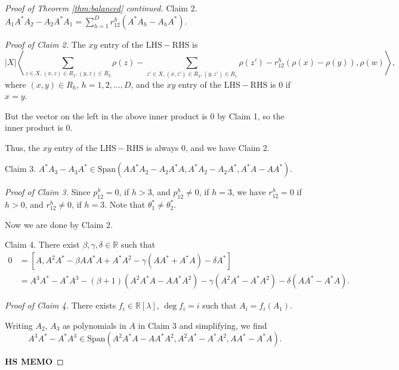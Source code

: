\documentclass[
]{book}
\theoremstyle{definition}
\theoremstyle{definition}
\theoremstyle{definition}
\theoremstyle{definition}
\theoremstyle{remark}
\begin{document}
\begin{proof}[Proof of Theorem \ref{thm:balanced} continued]
Claim 2.
\({\displaystyle A_1A^*A_2 - A_2A^*A_1 = \sum_{h=1}^D r^h_{12}(A^*A_h - A_hA^*).}\)

\emph{Proof of Claim 2.}
The \(xy\) entry of the \(\mathrm{LHS} - \mathrm{RHS}\) is
\[|X|\left\langle \sum_{z\in X, (x,z)\in R_1, (y,z)\in R_2}\rho(z) - \sum_{z'\in X, (x,z')\in R_2, (y,z')\in R_1}\rho(z') - r^h_{12}(\rho(x)-\rho(y)),\rho(w)\right\rangle,\]
where \((x,y)\in R_h\), \(h = 1, 2, \ldots, D\), and the \(xy\) entry of the \(\mathrm{LHS} - \mathrm{RHS}\) is \(0\) if \(x = y\).

But the vector on the left in the above inner product is \(0\) by Claim 1, so the inner product is \(0\).

Thus, the \(xy\) entry of the \(\mathrm{LHS} - \mathrm{RHS}\) is always \(0\), and we have Claim 2.

Claim 3. \(A^*A_3 - A_3A^* \in \mathrm{Span}(AA^*A_2 - A_2A^*A, A^*A_2 - A_2A^*, A^*A-AA^*).\)

\emph{Proof of Claim 3.}
Since \(p^h_{12} = 0\), if \(h>3\), and \(p^h_{12} \neq 0\), if \(h=3\), we have \(r^h_{12} = 0\) if \(h > 0\), and \(r^h_{12} \neq 0\), if \(h = 3\). Note that \(\theta^*_1\neq \theta^*_2\).

Now we are done by Claim 2.

Claim 4. There exist \(\beta, \gamma, \delta\in \mathbb{R}\) such that
\begin{align}
0 & = [A, A^2A^*-\beta AA^*A + A^*A^2 - \gamma(AA^*+A^*A) - \delta A^*]\\
& = A^3A^* - A^*A^3 - (\beta+1)(A^2A^*A-AA^*A^2)-\gamma(A^2A^*-A^*A^2)-\delta(AA^*-A^*A).
\end{align}

\emph{Proof of Claim 4.}
There exists \(f_i\in \mathbb{R}[\lambda]\), \(\deg f_i = i\) such that \(A_i = f_i(A_1)\).

Writing \(A_2\), \(A_3\) as polynomials in \(A\) in Claim 3 and simplifying, we find
\[A^3A^*-A^*A^3 \in \mathrm{Span}(A^2A^*A-AA^*A^2, A^2A^*-A^*A^2, AA^*-A^*A).\]

\textbf{HS MEMO}


\end{proof}
\end{document}
